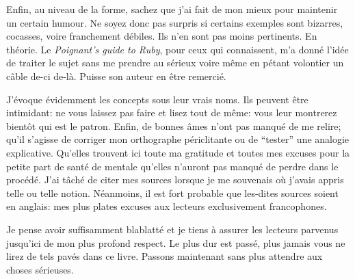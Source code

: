 Enfin, au niveau de la forme, sachez que j'ai fait de mon mieux pour
maintenir un certain humour. Ne soyez donc pas surpris si certains
exemples sont bizarres, cocasses, voire franchement débiles. Ils n'en
sont pas moins pertinents. En théorie. Le \emph{Poignant's guide to
Ruby}, pour ceux qui connaissent, m'a donné l'idée de traiter le sujet
sans me prendre au sérieux voire même en pétant volontier un câble
de-ci de-là. Puisse son auteur en être remercié.

J'évoque évidemment les concepts sous leur vrais noms. Ils peuvent
être intimidant: ne vous laissez pas faire et lisez tout de même: vous
leur montrerez bientôt qui est le patron. Enfin, de bonnes âmes n'ont
pas manqué de me relire; qu'il s'agisse de corriger mon orthographe
périclitante ou de ``tester'' une analogie explicative. Qu'elles
trouvent ici toute ma gratitude et toutes mes excuses pour la petite
part de santé de mentale qu'elles n'auront pas manqué de perdre dans
le procédé. J'ai tâché de citer mes sources lorsque je me souvenais
où j'avais appris telle ou telle notion. Néanmoins, il est fort
probable que les-dites sources soient en anglais: mes plus plates
excuses aux lecteurs exclusivement francophones.

Je pense avoir suffisamment blablatté et je tiens à assurer les
lecteurs parvenus jusqu'ici de mon plus profond respect. Le plus dur
est passé, plus jamais vous ne lirez de tels pavés dans ce
livre. Passons maintenant sans plus attendre aux choses sérieuses.
